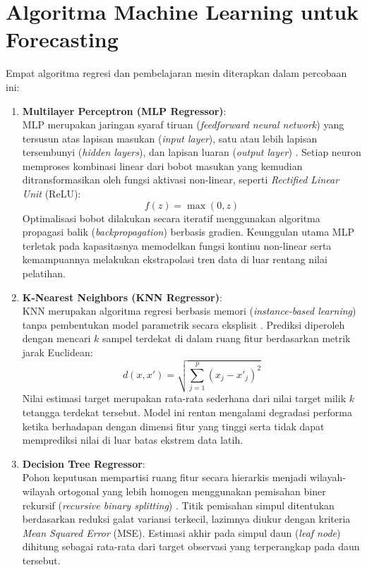 \documentclass[a4paper,oneside,12pt]{report}
\begin{document}
\section{Algoritma Machine Learning untuk Forecasting}
Empat algoritma regresi dan pembelajaran mesin diterapkan dalam percobaan ini:

\begin{enumerate}
    \item \textbf{Multilayer Perceptron (MLP Regressor)}: \\
    MLP merupakan jaringan syaraf tiruan (\textit{feedforward neural network}) yang tersusun atas lapisan masukan (\textit{input layer}), satu atau lebih lapisan tersembunyi (\textit{hidden layers}), dan lapisan luaran (\textit{output layer}) \cite{ref_russell}. Setiap neuron memproses kombinasi linear dari bobot masukan yang kemudian ditransformasikan oleh fungsi aktivasi non-linear, seperti \textit{Rectified Linear Unit} (ReLU):
    \begin{equation}
        f(z) = \max(0, z)
    \end{equation}
    Optimalisasi bobot dilakukan secara iteratif menggunakan algoritma propagasi balik (\textit{backpropagation}) berbasis gradien. Keunggulan utama MLP terletak pada kapasitasnya memodelkan fungsi kontinu non-linear serta kemampuannya melakukan ekstrapolasi tren data di luar rentang nilai pelatihan.

    \item \textbf{K-Nearest Neighbors (KNN Regressor)}: \\
    KNN merupakan algoritma regresi berbasis memori (\textit{instance-based learning}) tanpa pembentukan model parametrik secara eksplisit \cite{ref_pedregosa}. Prediksi diperoleh dengan mencari $k$ sampel terdekat di dalam ruang fitur berdasarkan metrik jarak Euclidean:
    \begin{equation}
        d(x, x') = \sqrt{\sum_{j=1}^p (x_j - x'_j)^2}
    \end{equation}
    Nilai estimasi target merupakan rata-rata sederhana dari nilai target milik $k$ tetangga terdekat tersebut. Model ini rentan mengalami degradasi performa ketika berhadapan dengan dimensi fitur yang tinggi serta tidak dapat memprediksi nilai di luar batas ekstrem data latih.

    \item \textbf{Decision Tree Regressor}: \\
    Pohon keputusan mempartisi ruang fitur secara hierarkis menjadi wilayah-wilayah ortogonal yang lebih homogen menggunakan pemisahan biner rekursif (\textit{recursive binary splitting}) \cite{ref_han}. Titik pemisahan simpul ditentukan berdasarkan reduksi galat variansi terkecil, lazimnya diukur dengan kriteria \textit{Mean Squared Error} (MSE). Estimasi akhir pada simpul daun (\textit{leaf node}) dihitung sebagai rata-rata dari target observasi yang terperangkap pada daun tersebut.


\end{enumerate}
\end{document}

